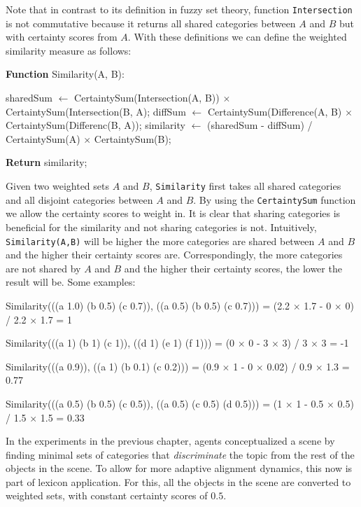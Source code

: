 \noindent Note that in contrast to its definition in fuzzy set theory,
function \texttt{Intersection} is not commutative because it returns
all shared categories between $A$ and $B$ but with certainty scores from
$A$.  With these definitions we can define the weighted similarity
measure as follows:

\begin{verbatim+}
\textbf{Function} Similarity(A, B):

sharedSum $\leftarrow$ CertaintySum(Intersection(A, B)) 
                $\times$ CertaintySum(Intersection(B, A);
diffSum $\leftarrow$ CertaintySum(Difference(A, B) 
              $\times$ CertaintySum(Differenc(B, A));
similarity $\leftarrow$ (sharedSum - diffSum) 
                  / CertaintySum(A) $\times$ CertaintySum(B);

\textbf{Return} similarity;
\end{verbatim+}


\noindent Given two weighted sets $A$ and $B$, \texttt{Similarity} first takes
all shared categories and all disjoint categories between $A$ and $B$. By
using the \texttt{CertaintySum} function we allow the certainty scores
to weight in. It is clear that sharing categories is beneficial for
the similarity and not sharing categories is not. Intuitively,
\texttt{Similarity(A,B)} will be higher the more categories are shared
between $A$ and $B$ and the higher their certainty scores
are. Correspondingly, the more categories are not shared by $A$ and
$B$ and the higher their certainty scores, the lower the result will
be. Some examples:


\begin{verbatim+}
Similarity(((a 1.0) (b 0.5) (c 0.7)), ((a 0.5) (b 0.5) (c 0.7))) 
     = (2.2 $\times$ 1.7 - 0 $\times$ 0) / 2.2 $\times$ 1.7 = 1 
    
Similarity(((a 1) (b 1) (c 1)), ((d 1) (e 1) (f 1))) 
    = (0 $\times$ 0 - 3 $\times$ 3) / 3 $\times$ 3 = -1
    
Similarity(((a 0.9)), ((a 1) (b 0.1) (c 0.2))) 
    = (0.9 $\times$ 1 - 0 $\times$ 0.02) / 0.9 $\times$ 1.3 = 0.77
    
Similarity(((a 0.5) (b 0.5) (c 0.5)), ((a 0.5) (c 0.5) (d 0.5))) 
    = (1 $\times$ 1 - 0.5 $\times$ 0.5) / 1.5 $\times$ 1.5 = 0.33
\end{verbatim+}

 In the experiments in the previous
chapter, agents conceptualized a scene by finding minimal sets of
categories that \emph{discriminate} the topic from the rest of the
objects in the scene. To allow for more adaptive alignment dynamics,
this now is part of lexicon application. For this, all the objects in
the scene are converted to weighted sets, with constant certainty
scores of $0.5$.

